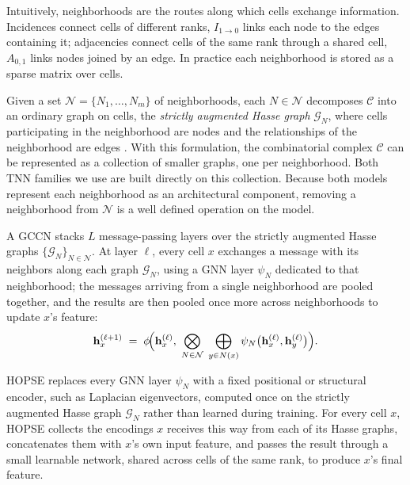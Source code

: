 Intuitively, neighborhoods are the routes along which cells exchange information. Incidences connect cells of different ranks, \eg $I_{1 \to 0}$ links each node to the edges containing it; adjacencies connect cells of the same rank through a shared cell, \eg $A_{0,1}$ links nodes joined by an edge. In practice each neighborhood is stored as a sparse matrix over cells. %

 Given a set $\mathcal{N} = \{N_1, \dots, N_m\}$ of neighborhoods, each $N \in \mathcal{N}$ decomposes $\mathcal{C}$ into an ordinary graph on cells, the \emph{strictly augmented Hasse graph} $\mathcal{G}_N$, where cells participating in the neighborhood are nodes and the relationships of the neighborhood are edges \citep{papillon2025topotune}. With this formulation, the combinatorial complex $\mathcal{C}$ can be represented as a collection of smaller graphs, one per neighborhood. Both TNN families we use are built directly on this collection. 
 Because both models represent each neighborhood as an architectural component, removing a neighborhood from $\mathcal{N}$ is a well defined operation on the model. %
 
\begin{definition}
\label{def:gccn}
A GCCN stacks $L$ message-passing layers over the strictly augmented Hasse graphs $\{\mathcal{G}_N\}_{N \in \mathcal{N}}$. At layer $\ell$, every cell $x$ exchanges a message with its neighbors along each graph $\mathcal{G}_N$, using a GNN layer $\psi_N$ dedicated to that neighborhood; the messages arriving from a single neighborhood are pooled together, and the results are then pooled once more across neighborhoods to update $x$'s feature:
\begin{equation}
\label{eq:gccn-layer}
\mathbf{h}^{(\ell+1)}_x
  \;=\;
  \phi\!\Bigl(\mathbf{h}^{(\ell)}_x,\;
  \bigotimes_{N \in \mathcal{N}}\;
  \bigoplus_{y \in N(x)}
  \psi_{N}\bigl(\mathbf{h}^{(\ell)}_x, \mathbf{h}^{(\ell)}_y\bigr)\Bigr).
\end{equation}
\end{definition}
 
\begin{definition}
\label{def:hopse}
HOPSE replaces every GNN layer $\psi_N$ with a fixed positional or structural encoder, such as Laplacian eigenvectors, computed once on the strictly augmented Hasse graph $\mathcal{G}_N$ rather than learned during training. For every cell $x$, HOPSE collects the encodings $x$ receives this way from each of its Hasse graphs, concatenates them with $x$'s own input feature, and passes the result through a small learnable network, shared across cells of the same rank, to produce $x$'s final feature. %
\end{definition}

